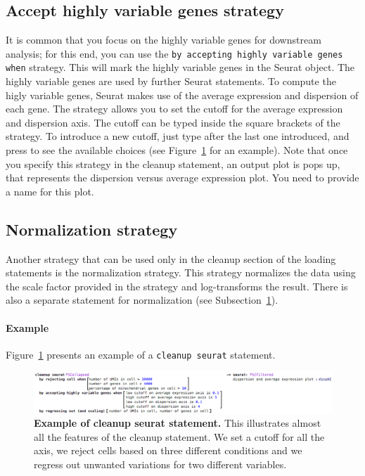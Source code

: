 \subsection{Accept highly variable genes strategy}
It is common that you focus on the highly variable genes for downstream analysis; for this end,
you can use the \texttt{by accepting highly variable genes when} strategy. This will mark
the highly variable genes in the Seurat object. The highly variable genes are used by further Seurat
statements. To compute the higly variable genes, Seurat makes use of the average expression
and dispersion of each gene. The strategy allows you to set the cutoff for the average expression
and dispersion axis. The cutoff can be typed inside the square brackets of the strategy. To
introduce a new cutoff, just type \keys{\return} after the last one introduced, and press
\keys{\ctrl+\space} to see the available choices (see Figure~\ref{fig:ExampleCleanupSeurat}
for an example). Note that once you specify this strategy in the cleanup statement, an
output plot is pops up, that represents the dispersion versus average expression plot. You
need to provide a name for this plot.

\subsection{Normalization strategy}
Another strategy that can be used only in the cleanup section of the loading statements is the
normalization strategy. This strategy normalizes the data using the scale factor provided
in the strategy and log-transforms the result. There is also a separate statement for normalization (see
Subsection~\ref{fig:ExampleCleanupSeurat}).

\paragraph{Example} Figure~\ref{fig:ExampleCleanupSeurat} presents an example of a
\texttt{cleanup seurat} statement.

\begin{figure}[h!tbp]
  \centering
  \includegraphics[width=\figWidthWide]{figures/ExampleCleanupSeurat.png}
    \caption[Example of cleanup seurat statement.]{\textbf{Example of cleanup seurat statement.}
    This illustrates almost all the features of the cleanup statement. We set a cutoff for
    all the axis, we reject cells based on three different conditions and we regress out
    unwanted variations for two different variables.}
\label{fig:ExampleCleanupSeurat}
\end{figure}

